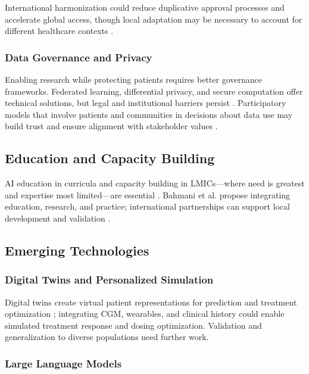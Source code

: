 International harmonization could reduce duplicative approval processes and accelerate global access, though local adaptation may be necessary to account for different healthcare contexts \cite{mackenzie2023diabetes, ghosh2025artificial}.

\subsubsection{Data Governance and Privacy}

Enabling research while protecting patients requires better governance frameworks. Federated learning, differential privacy, and secure computation offer technical solutions, but legal and institutional barriers persist \cite{bai2024federated, fahmy2025exploring, mackenzie2023diabetes}. Participatory models that involve patients and communities in decisions about data use may build trust and ensure alignment with stakeholder values \cite{mackenzie2023diabetes}.

\subsection{Education and Capacity Building}

AI education in curricula and capacity building in LMICs—where need is greatest and expertise most limited—are essential \cite{mackenzie2023diabetes, bahmani2025achieving, ghosh2025artificial, fahmy2025exploring}. Bahmani et al. \cite{bahmani2025achieving} propose integrating education, research, and practice; international partnerships can support local development and validation \cite{mackenzie2023diabetes}.

\subsection{Emerging Technologies}

\subsubsection{Digital Twins and Personalized Simulation}

Digital twins create virtual patient representations for prediction and treatment optimization \cite{cappon2024digital}; integrating CGM, wearables, and clinical history could enable simulated treatment response and dosing optimization. Validation and generalization to diverse populations need further work.

\subsubsection{Large Language Models}

